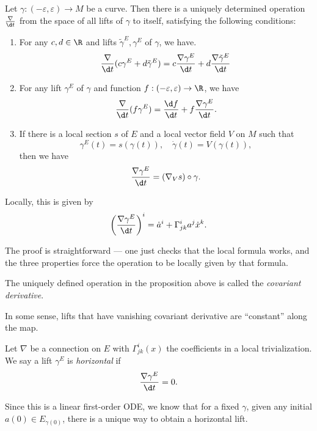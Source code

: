 \documentclass[a4paper]{article}
\begin{document}
\begin{prop}
  Let $\gamma: (-\varepsilon, \varepsilon) \to M$ be a curve. Then there is a uniquely determined operation $\frac{\nabla}{\d t}$ from the space of all lifts of $\gamma$ to itself, satisfying the following conditions:
  \begin{enumerate}
    \item For any $c, d \in \R$ and lifts $\tilde{\gamma}^E, \gamma^E$ of $\gamma$, we have.
      \[
        \frac{\nabla}{\d t}(c\gamma^E + d \tilde{\gamma}^E) = c\frac{\nabla \gamma^E}{\d t} + d \frac{\nabla \tilde{\gamma}^E}{\d t}
      \]
    \item For any lift $\gamma^E$ of $\gamma$ and function $f: (-\varepsilon, \varepsilon) \to \R$, we have
      \[
        \frac{\nabla}{\d t}(f \gamma^E) = \frac{\d f}{\d t} + f \frac{\nabla \gamma^E}{\d t}.
      \]
    \item If there is a local section $s$ of $E$ and a local vector field $V$ on $M$ such that
      \[
        \gamma^E(t) = s(\gamma(t)),\quad \dot{\gamma}(t) = V(\gamma(t)),
      \]
      then we have
      \[
        \frac{\nabla \gamma^E}{\d t} = (\nabla_V s) \circ \gamma.
      \]
  \end{enumerate}
  Locally, this is given by
  \[
    \left(\frac{\nabla \gamma^E}{\d t}\right)^i = \dot{a}^i + \Gamma^i_{jk} a^j \dot{x}^k.
  \]
\end{prop}
The proof is straightforward --- one just checks that the local formula works, and the three properties force the operation to be locally given by that formula.

\begin{defi}
  The uniquely defined operation in the proposition above is called the \emph{covariant derivative}.
\end{defi}

In some sense, lifts that have vanishing covariant derivative are ``constant'' along the map.

\begin{defi}
  Let $\nabla$ be a connection on $E$ with $\Gamma^i_{jk}(x)$ the coefficients in a local trivialization. We say a lift $\gamma^E$ is \emph{horizontal} if
  \[
    \frac{\nabla \gamma^E}{\d t} = 0.
  \]
\end{defi}
Since this is a linear first-order ODE, we know that for a fixed $\gamma$, given any initial $a(0) \in E_{\gamma(0)}$, there is a unique way to obtain a horizontal lift.
\end{document}

